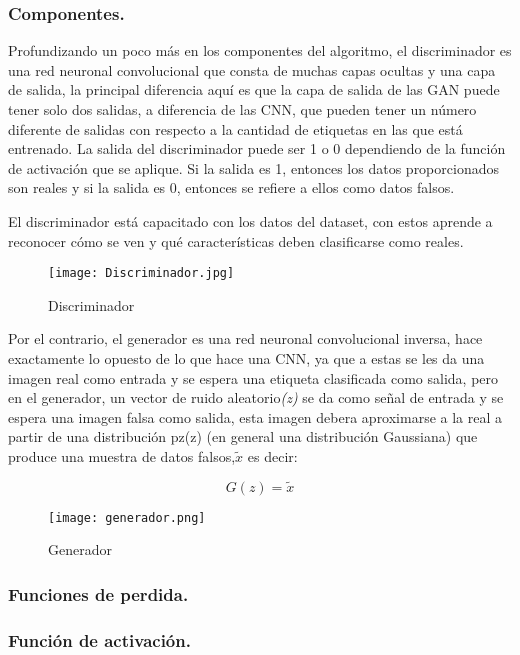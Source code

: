 \subsubsection{Componentes.}

Profundizando un poco más en los componentes del algoritmo, el discriminador es una red neuronal convolucional que consta de muchas 
capas ocultas y una capa de salida, la principal diferencia aquí es que la capa de salida de las GAN puede tener solo dos salidas, 
a diferencia de las CNN, que pueden tener un número diferente de salidas con respecto a la cantidad de etiquetas en las que está entrenado.
La salida del discriminador puede ser 1 o 0 dependiendo de la función de activación que se aplique. Si la salida es 1, 
entonces los datos proporcionados son reales y si la salida es 0, entonces se refiere a ellos como datos falsos.

El discriminador está capacitado con los datos del dataset, con estos aprende a reconocer cómo se ven y qué características deben 
clasificarse como reales.




\begin{figure}[H]
    \begin{center}
      \texttt{[image: Discriminador.jpg]}
      \caption{Discriminador}
      \label{Alexis2}
    \end{center}
\end{figure}


Por el contrario, el generador es una red neuronal convolucional inversa, hace exactamente lo opuesto de lo que hace una CNN, ya que 
a estas se les da una imagen real como entrada y se espera una etiqueta clasificada como salida, 
pero en el generador, un vector de ruido aleatorio\emph{(z)} se da como señal de entrada 
y se espera una imagen falsa como salida, esta imagen debera aproximarse a la real a
partir de una distribución pz(z) (en general una distribución Gaussiana) que
produce una muestra de datos falsos,$\tilde{x}$ es decir:

\begin{equation}
G(z) = \tilde{x}
\end{equation}




\begin{figure}[H]
    \begin{center}
      \texttt{[image: generador.png]}
      \caption{Generador}
      \label{Alexis3}
    \end{center}
\end{figure}
    
    \subsubsection{Funciones de perdida.}






    
    \subsubsection{Función de activación.}



